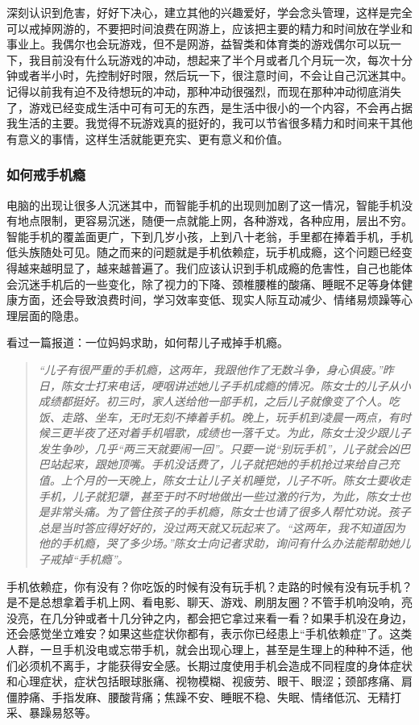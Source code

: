 深刻认识到危害，好好下决心，建立其他的兴趣爱好，学会念头管理，这样是完全可以戒掉网游的，不要把时间浪费在网游上，应该把主要的精力和时间放在学业和事业上。我偶尔也会玩游戏，但不是网游，益智类和体育类的游戏偶尔可以玩一下，我目前没有什么玩游戏的冲动，想起来了半个月或者几个月玩一次，每次十分钟或者半小时，先控制好时限，然后玩一下，很注意时间，不会让自己沉迷其中。记得以前我有迫不及待想玩的冲动，那种冲动很强烈，而现在那种冲动彻底消失了，游戏已经变成生活中可有可无的东西，是生活中很小的一个内容，不会再占据我生活的主要。我觉得不玩游戏真的挺好的，我可以节省很多精力和时间来干其他有意义的事情，这样生活就能更充实、更有意义和价值。

\subsubsection{如何戒手机瘾}

电脑的出现让很多人沉迷其中，而智能手机的出现则加剧了这一情况，智能手机没有地点限制，更容易沉迷，随便一点就能上网，各种游戏，各种应用，层出不穷。智能手机的覆盖面更广，下到几岁小孩，上到八十老翁，手里都在捧着手机，手机低头族随处可见。随之而来的问题就是手机依赖症，玩手机成瘾，这个问题已经变得越来越明显了，越来越普遍了。我们应该认识到手机成瘾的危害性，自己也能体会沉迷手机后的一些变化，除了视力的下降、颈椎腰椎的酸痛、睡眠不足等身体健康方面，还会导致浪费时间，学习效率变低、现实人际互动减少、情绪易烦躁等心理层面的隐患。

看过一篇报道：一位妈妈求助，如何帮儿子戒掉手机瘾。

\begin{quote}\it
    “儿子有很严重的手机瘾，这两年，我跟他作了无数斗争，身心俱疲。”昨日，陈女士打来电话，哽咽讲述她儿子手机成瘾的情况。陈女士的儿子从小成绩都挺好。初三时，家人送给他一部手机，之后儿子就像变了个人。吃饭、走路、坐车，无时无刻不捧着手机。晚上，玩手机到凌晨一两点，有时候三更半夜了还对着手机唱歌，成绩也一落千丈。为此，陈女士没少跟儿子发生争吵，几乎“两三天就要闹一回”。只要一说“别玩手机”，儿子就会凶巴巴站起来，跟她顶嘴。手机没话费了，儿子就把她的手机抢过来给自己充值。上个月的一天晚上，陈女士让儿子关机睡觉，儿子不听。陈女士要收走手机，儿子就犯犟，甚至于时不时地做出一些过激的行为，为此，陈女士也是非常头痛。为了管住孩子的手机瘾，陈女士也请了很多人帮忙劝说。孩子总是当时答应得好好的，没过两天就又玩起来了。“这两年，我不知道因为他的手机瘾，哭了多少场。”陈女士向记者求助，询问有什么办法能帮助她儿子戒掉“手机瘾”。
\end{quote}

手机依赖症，你有没有？你吃饭的时候有没有玩手机？走路的时候有没有玩手机？是不是总想拿着手机上网、看电影、聊天、游戏、刷朋友圈？不管手机响没响，亮没亮，在几分钟或者十几分钟之内，都会把它拿过来看一看？如果手机没在身边，还会感觉坐立难安？如果这些症状你都有，表示你已经患上“手机依赖症”了。这类人群，一旦手机没电或忘带手机，就会出现心理上，甚至是生理上的种种不适，他们必须机不离手，才能获得安全感。长期过度使用手机会造成不同程度的身体症状和心理症状，症状包括眼球胀痛、视物模糊、视疲劳、眼干、眼涩；颈部疼痛、肩僵脖痛、手指发麻、腰酸背痛；焦躁不安、睡眠不稳、失眠、情绪低沉、无精打采、暴躁易怒等。

